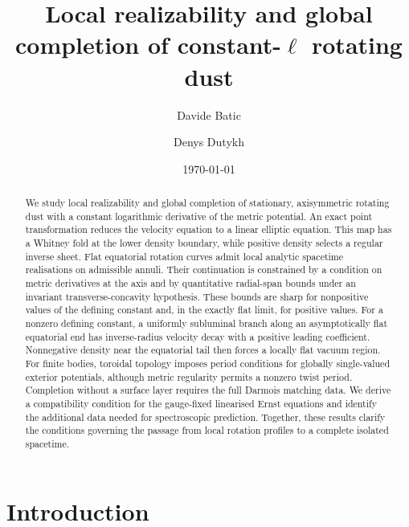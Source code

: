 \documentclass[amsmath,amsfonts,amssymb,aps,pra,superscriptaddress,10pt]{revtex4-2}
\numberwithin{equation}{section}
\theoremstyle{plain}
\theoremstyle{definition}
\theoremstyle{remark}
\theoremstyle{definition}
\begin{document}
\title{Local realizability and global completion of constant-\texorpdfstring{$\ell$}{ell} rotating dust}
\author{Davide Batic}

\author{Denys Dutykh}

\date{\today}

\begin{abstract}
We study local realizability and global completion of stationary, axisymmetric rotating dust with a constant logarithmic derivative of the metric potential. An exact point transformation reduces the velocity equation to a linear elliptic equation. This map has a Whitney fold at the lower density boundary, while positive density selects a regular inverse sheet. Flat equatorial rotation curves admit local analytic spacetime realisations on admissible annuli. Their continuation is constrained by a condition on metric derivatives at the axis and by quantitative radial-span bounds under an invariant transverse-concavity hypothesis. These bounds are sharp for nonpositive values of the defining constant and, in the exactly flat limit, for positive values. For a nonzero defining constant, a uniformly subluminal branch along an asymptotically flat equatorial end has inverse-radius velocity decay with a positive leading coefficient. Nonnegative density near the equatorial tail then forces a locally flat vacuum region. For finite bodies, toroidal topology imposes period conditions for globally single-valued exterior potentials, although metric regularity permits a nonzero twist period. Completion without a surface layer requires the full Darmois matching data. We derive a compatibility condition for the gauge-fixed linearised Ernst equations and identify the additional data needed for spectroscopic prediction. Together, these results clarify the conditions governing the passage from local rotation profiles to a complete isolated spacetime.
\end{abstract}

\maketitle

\section{Introduction}\label{Intro}
\end{document}
